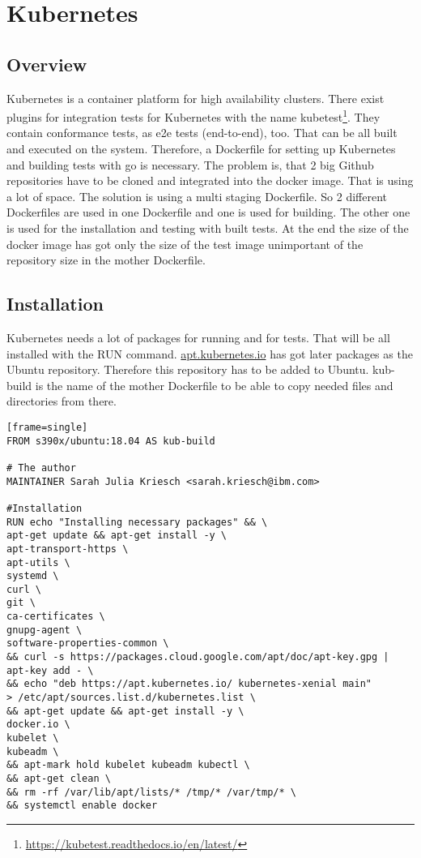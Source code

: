 \usepackage{verbatim}

\chapter{Kubernetes}\label{ch:kubernetes}

\section{Overview}

Kubernetes is a container platform for high availability clusters.
There exist plugins for integration tests for Kubernetes with the name kubetest\footnote{\url{https://kubetest.readthedocs.io/en/latest/}}. They contain conformance tests, as e2e tests (end-to-end), too.
That can be all built and executed on the system. Therefore, a Dockerfile for setting up Kubernetes and building tests with go is necessary. The problem is, that 2 big Github repositories have to be cloned and integrated into the docker image. That is using a lot of space. The solution is using a multi staging Dockerfile. 
So 2 different Dockerfiles are used in one Dockerfile and one is used for building. The other one is used for the installation and testing with built tests. At the end the size of the docker image has got only the size of the test image unimportant of the repository size in the mother Dockerfile.

\section{Installation}

Kubernetes needs a lot of packages for running and for tests. That will be all installed with the RUN command.
\url{apt.kubernetes.io} has got later packages as the Ubuntu repository. Therefore this repository has to be added to Ubuntu. kub-build is the name of the mother Dockerfile to be able to copy needed files and directories from there.

\begin{verbatim}[frame=single]
FROM s390x/ubuntu:18.04 AS kub-build
 
# The author
MAINTAINER Sarah Julia Kriesch <sarah.kriesch@ibm.com>

#Installation
RUN echo "Installing necessary packages" && \
apt-get update && apt-get install -y \
apt-transport-https \
apt-utils \
systemd \
curl \
git \
ca-certificates \
gnupg-agent \
software-properties-common \
&& curl -s https://packages.cloud.google.com/apt/doc/apt-key.gpg | apt-key add - \
&& echo "deb https://apt.kubernetes.io/ kubernetes-xenial main" 
> /etc/apt/sources.list.d/kubernetes.list \
&& apt-get update && apt-get install -y \
docker.io \
kubelet \
kubeadm \
&& apt-mark hold kubelet kubeadm kubectl \
&& apt-get clean \
&& rm -rf /var/lib/apt/lists/* /tmp/* /var/tmp/* \
&& systemctl enable docker 
\end{verbatim}

